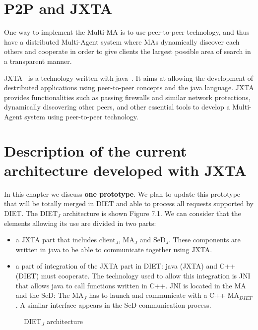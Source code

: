 \section{P2P and JXTA}
\label{sec:JXTA}

One way to implement the Multi-MA is to use peer-to-peer technology,
and thus have a distributed Multi-Agent system where MAs dynamically
discover each others and cooperate in order to give clients the largest
possible area of search in a transparent manner.

JXTA~\cite{JXTA} is a technology written with java~\cite{java}. It
aims at allowing the development of destributed applications using
peer-to-peer concepts and the java language. JXTA provides
functionalities such as passing firewalls and similar network
protections, dynamically discovering other peers, and other essential
tools to develop a Multi-Agent system using peer-to-peer technology.

\section{Description of the current architecture developed with JXTA}
\label{sec:archi}

In this chapter we discuss \textbf{one prototype}. We plan to update
this prototype that will be totally merged in DIET and able to process
all requests supported by DIET. The DIET$_{J}$ architecture is shown
Figure 7.1.  We can consider that the elements allowing its use are
divided in two parts:

\begin{itemize}
\item{a JXTA part that includes client$_{J}$, MA$_{J}$ and
    SeD$_{J}$. These components are written in java to be able to
    communicate together using JXTA.}
  
\item{a part of integration of the JXTA part in DIET: java (JXTA) and
    C++ (DIET) must cooperate. The technology used to allow this
    integration is JNI~\cite{JNI} that allows java to call functions
    written in C++. JNI is located in the MA and the SeD: The
    MA$_{J}$ has to launch and communicate with a C++ MA$_{DIET}$.
    A similar interface appears in the SeD communication process.}
\end{itemize}

\begin{figure}[htb]
 \begin{center}
  \caption{DIET$_{J}$ architecture}
 \end{center}
\end{figure}

